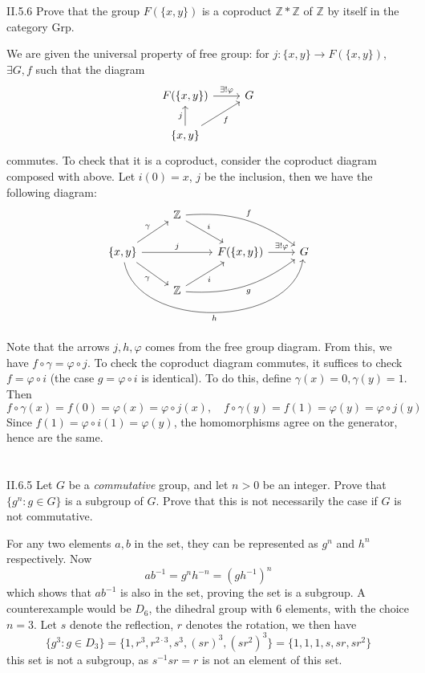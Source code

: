 \begin{problem}{II.5.6}
Prove that the group $F(\{x,y\})$ is a coproduct $\mathbb{Z} * \mathbb{Z}$ of $\mathbb{Z}$ by itself in the category \textsf{Grp}.
\end{problem}
\begin{pf}
We are given the universal property of free group: for $j:\{x,y\} \to F(\{x,y\})$, $\exists G, f$ such that the diagram
\[
\begin{tikzcd}
{F(\{x,y\})} \arrow[r, "\exists ! \varphi"] & G \\
{\{x,y\}} \arrow[u, "j"] \arrow[ru, "f"']   &  
\end{tikzcd}
\]
commutes. To check that it is a coproduct, consider the coproduct diagram composed with above. Let $i(0)=x$, $j$ be the inclusion, then we have the following diagram:
\[
\begin{tikzcd}
& \Z \arrow[rd, "i"] \arrow[rrd, "f", bend left=20] &  &   \\
{\{x,y\}} \arrow[rr, "j"] \arrow[ru, "\gamma"] \arrow[rd, "\gamma"'] \arrow[rrr, "h"', bend right=80] &  & {F(\{x,y\})} \arrow[r, "\exists ! \varphi"] & G \\
& \Z \arrow[ru, "i"'] \arrow[rru, "g"', bend right=20]
\end{tikzcd}
\]
Note that the arrows $j, h, \varphi$ comes from the free group diagram. From this, we have $f \circ \gamma = \varphi \circ j$.
To check the coproduct diagram commutes, it suffices to check $f = \varphi \circ i$ (the case $g = \varphi \circ i$ is identical). To do this, define $\gamma(x) = 0, \gamma(y) = 1$. Then 
\[
f \circ \gamma (x) = f(0) = \varphi (x) = \varphi \circ j(x), \quad f \circ \gamma (y) = f(1) = \varphi (y) = \varphi \circ j(y)
\]
Since $f(1) = \varphi \circ i (1) = \varphi (y)$, the homomorphisms agree on the generator, hence are the same. 
\end{pf}

\section{}

\begin{problem}{II.6.5}
Let $G$ be a \emph{commutative} group, and let $n>0$ be an integer. Prove that $\{g^n : g \in G\}$ is a subgroup of $G$. Prove that this is not necessarily the case if $G$ is not commutative. 
\end{problem}
\begin{pf}
For any two elements $a,b$ in the set, they can be represented as $g^n$ and $h^n$ respectively. Now 
\[
ab^{-1} = g^nh^{-n} = (gh^{-1})^n
\]
which shows that $ab^{-1}$ is also in the set, proving the set is a subgroup. A counterexample would be $D_6$, the dihedral group with $6$ elements, with the choice $n = 3$. Let $s$ denote the reflection, $r$ denotes the rotation, we then have 
\[
\{g^3 : g \in D_3\} = \{1, r^3, r^{2 \cdot 3}, s^3, (sr)^3, (sr^2)^3\} = \{1, 1, 1, s, sr, sr^2\}
\]
this set is not a subgroup, as $s^{-1}sr = r$ is not an element of this set.
\end{pf}

